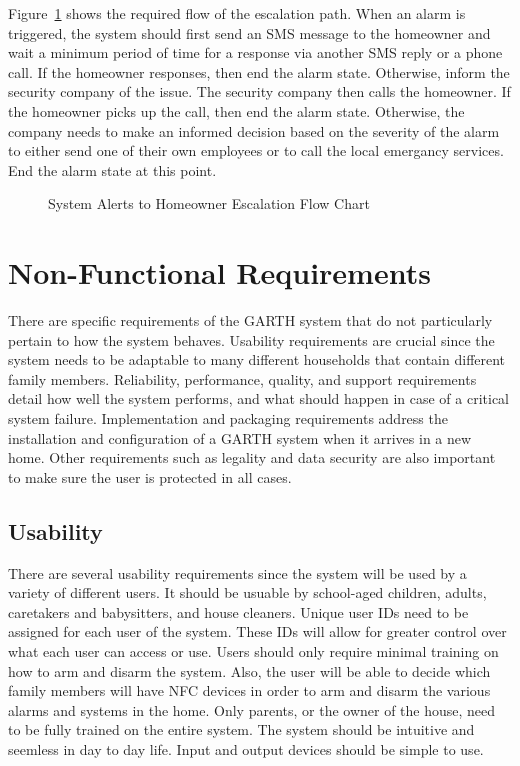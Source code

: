 \documentclass{report}
\begin{document}
Figure~\ref{fig:system_to_user_chart} shows the required flow of the escalation
path. When an alarm is triggered, the system should first send an SMS message
to the homeowner and wait a minimum period of time for a response via another
SMS reply or a phone call. If the homeowner responses, then end the alarm
state. Otherwise, inform the security company of the issue. The security
company then calls the homeowner. If the homeowner picks up the call, then end
the alarm state. Otherwise, the company needs to make an informed decision
based on the severity of the alarm to either send one of their own employees
or to call the local emergancy services. End the alarm state at this point.

\begin{figure}[hp]
    \centering
        \caption{System Alerts to Homeowner Escalation Flow Chart}
        \scriptsize
        \setlength{\unitlength}{2.0em}
        
        \normalsize
    \label{fig:system_to_user_chart}
\end{figure}

\chapter{Non-Functional Requirements}
There are specific requirements of the GARTH system that do not particularly
pertain to how the system behaves. Usability requirements are crucial since the
system needs to be adaptable to many different households that contain
different family members. Reliability, performance, quality, and support
requirements detail how well the system performs, and what should happen in
case of a critical system failure. Implementation and packaging requirements
address the installation and configuration of a GARTH system when it arrives in
a new home. Other requirements such as legality and data security are also
important to make sure the user is protected in all cases.


\section{Usability}
There are several usability requirements since the system will be used by a
variety of different users. It should be usuable by school-aged children,
adults, caretakers and babysitters, and house cleaners. Unique user IDs need to
be assigned for each user of the system. These IDs will allow for greater
control over what each user can access or use. Users should only require
minimal training on how to arm and disarm the system. Also, the user will be
able to decide which family members will have NFC devices in order to arm and
disarm the various alarms and systems in the home.  Only parents, or the owner
of the house, need to be fully trained on the entire system. The system should
be intuitive and seemless in day to day life. Input and output devices should
be simple to use.
\end{document}
